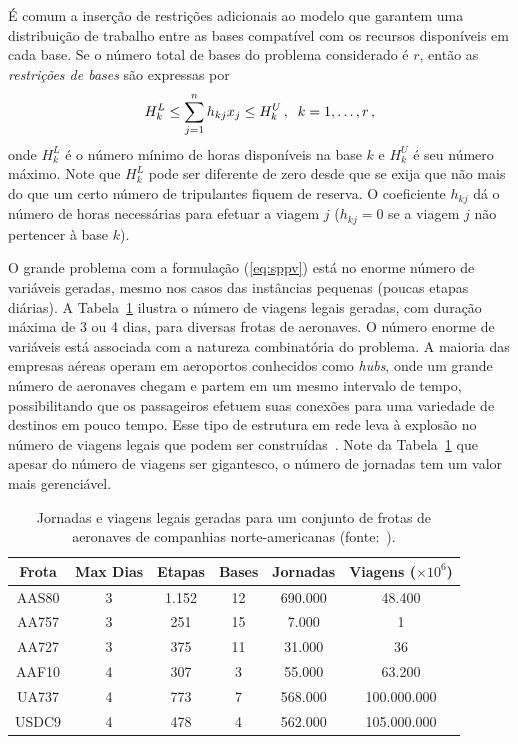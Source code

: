 É comum a inserção de restrições adicionais ao modelo que garantem uma distribuição de trabalho
entre as bases compatível com os recursos disponíveis em cada base. Se o número total de bases do
problema considerado é $r$, então as \emph{restrições de bases} são expressas por
%
\begin{equation} \label{eq:bases}
	H_k^L \leq \sum_{j=1}^n h_{kj} x_j \leq H_k^U \, , \;\; k = 1, \ldots, r \, ,
\end{equation}
%
onde $H_k^L$ é o número mínimo de horas disponíveis na base $k$ e $H_k^U$ é seu número máximo. 
Note que $H_k^L$ pode ser diferente de zero desde que se exija que não mais do que um certo número 
de tripulantes fiquem de reserva. O coeficiente $h_{kj}$ dá o número de horas necessárias para 
efetuar a viagem $j$ ($h_{kj} = 0$ se a viagem $j$ não pertencer à base $k$).

O grande problema com a formulação (\ref{eq:sppv}) está no enorme número de variáveis geradas, mesmo
nos casos das instâncias pequenas (poucas etapas diárias). A Tabela~\ref{tab:viagens} ilustra o
número de viagens legais geradas, com duração máxima de 3 ou 4 dias, para diversas frotas de
aeronaves. O número enorme de variáveis está associada com a natureza combinatória do problema. A
maioria das empresas aéreas operam em aeroportos conhecidos como \emph{hubs}, onde um grande número
de aeronaves chegam e partem em um mesmo intervalo de tempo, possibilitando que os passageiros
efetuem suas conexões para uma variedade de destinos em pouco tempo. Esse tipo de estrutura em rede 
leva à explosão no número de viagens legais que podem ser construídas~\cite{graves93}. Note da
Tabela~\ref{tab:viagens} que apesar do número de viagens ser gigantesco, o número de 
jornadas tem um valor mais gerenciável.

\begin{table}[ht]
	\begin{center}
		\begin{tabular}{|c||c|c|c|c|c|}
			\hline
			{\bf Frota} & {\bf Max Dias} & {\bf Etapas} & {\bf Bases} & {\bf Jornadas} & 
			{\bf Viagens} ($\times 10^6$) \\
			\hline
			AAS80 & 3 & 1.152 & 12 & 690.000 & 48.400 \\
			\hline
			AA757 & 3 & 251 & 15 & 7.000 & 1 \\
			\hline
			AA727 & 3 & 375 & 11 & 31.000 & 36 \\
			\hline
			AAF10 & 4 & 307 & 3 & 55.000 & 63.200 \\
			\hline 
			UA737 & 4 & 773 & 7 & 568.000 & 100.000.000 \\
			\hline
			USDC9 & 4 & 478 & 4 & 562.000 & 105.000.000 \\
			\hline
		\end{tabular}
		\caption{Jornadas e viagens legais geradas para um conjunto de frotas de aeronaves de companhias
		norte-americanas (fonte:~\cite{anbil98}).}
		\label{tab:viagens}
	\end{center}
\end{table}

